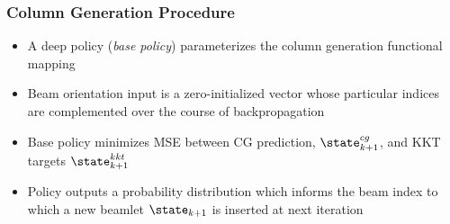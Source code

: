 \begin{frame}
	\frametitle{Column Generation Procedure}
	\begin{itemize}
		\item A deep policy (\textit{base policy}) parameterizes the column generation functional mapping 
		\vspace{0.1in}
		\item Beam orientation input is a zero-initialized vector whose particular indices are complemented over the course of backpropagation
		\vspace{0.1in}
		\item Base policy minimizes MSE between CG prediction, $\state_{k+1}^{cg}$, and KKT targets $\state_{k+1}^{kkt}$
		\vspace{0.1in}
		\item Policy outputs a probability distribution which informs the beam index to which a new beamlet $\state_{k+1}$ is inserted at next iteration
	\end{itemize}
\end{frame}


